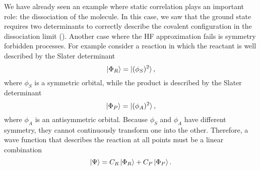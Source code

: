 \documentclass[../Main/chem532-notes.tex]{subfiles}
\begin{document}
We have already seen an example where static correlation plays an important role: the dissociation of the  molecule. In this case, we saw that the ground state requires two determinants to correctly describe the covalent configuration in the dissociation limit ().
Another case where the HF approximation fails is symmetry forbidden processes. For example consider a reaction in which the reactant is well described by the Slater determinant
\begin{equation}
\ket{\Phi_R} = \ket{(\phi_{S})^2},
\end{equation}
where $\phi_{S}$ is a symmetric orbital, while the product is described by the Slater determinant
\begin{equation}
\ket{\Phi_P} = \ket{(\phi_{A})^2},
\end{equation}
where $\phi_{A}$ is an antisymmetric orbital.
Because $\phi_{S}$ and $\phi_{A}$ have different symmetry, they cannot continuously transform one into the other. Therefore, a wave function that describes the reaction at all points must be a linear combination
\begin{equation}
\ket{\Psi} = C_R \ket{\Phi_R} + C_P \ket{\Phi_P}.
\end{equation}
\end{document}
